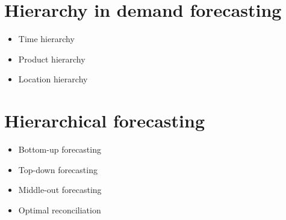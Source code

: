 \section{Hierarchy in demand forecasting}
\label{sec:hierarchy_in_demand_forecasting}



\begin{itemize}
    \item Time hierarchy
    \item Product hierarchy
    \item Location hierarchy
\end{itemize}


\section{Hierarchical forecasting}
\label{sec:hierarchical_forecasting}

\begin{itemize}
    \item Bottom-up forecasting
    \item Top-down forecasting
    \item Middle-out forecasting
    \item Optimal reconciliation
\end{itemize}


